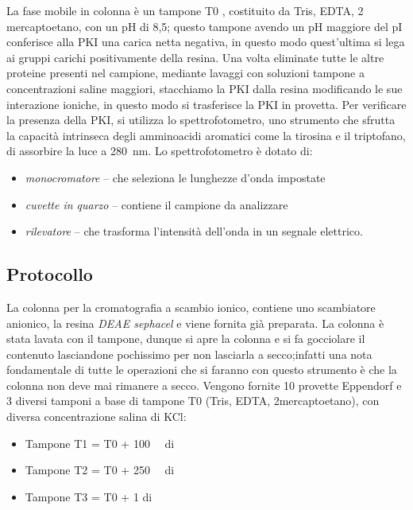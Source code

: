 \documentclass[twocolumn,a4paper,10pt]{my_report}
\begin{document}
{La fase mobile in colonna è un tampone T0 , costituito da Tris, EDTA, 2 mercaptoetano, con un pH di 8,5; questo tampone avendo un pH maggiore del pI conferisce alla PKI una carica netta negativa, in questo modo quest'ultima si lega ai gruppi carichi positivamente della resina. Una volta eliminate tutte le altre proteine presenti nel campione, mediante lavaggi con soluzioni tampone a concentrazioni saline maggiori, stacchiamo la PKI dalla resina modificando le sue interazione ioniche, in questo modo si trasferisce la PKI in provetta.
Per verificare la presenza della PKI, si utilizza lo spettrofotometro, uno strumento che sfrutta la capacità intrinseca degli amminoacidi aromatici come la tirosina e il triptofano, di assorbire la luce a \SI{280}{\nano\metre}. Lo spettrofotometro è dotato di:
\begin{itemize}
  \item \emph{monocromatore} -- che seleziona le lunghezze d'onda impostate
  \item \emph{cuvette in quarzo} -- contiene il campione da analizzare
  \item \emph{rilevatore} -- che trasforma l'intensità dell'onda in un segnale elettrico.
\end{itemize}



\subsection*{Protocollo}
La colonna per la cromatografia a scambio ionico, contiene uno scambiatore anionico, la resina \emph{DEAE sephacel} e viene fornita già preparata.
La colonna è stata lavata con il tampone, dunque si apre la colonna e si fa gocciolare il contenuto lasciandone pochissimo per non lasciarla a secco;infatti una nota fondamentale di tutte le operazioni che si faranno con questo strumento è che la colonna non deve mai rimanere a secco.
Vengono fornite 10 provette Eppendorf e 3 diversi tamponi a base di tampone T0 (Tris, EDTA, 2mercaptoetano), con diversa concentrazione salina di KCl:
\begin{itemize}
  \item Tampone T1 = T0 + \SI{100}{\milli\Molar} di 
  \item Tampone T2 = T0 + \SI{250}{\milli\Molar} di 
  \item Tampone T3 = T0 + \SI{1}{\Molar} di 
\end{itemize}

}
\end{document}
